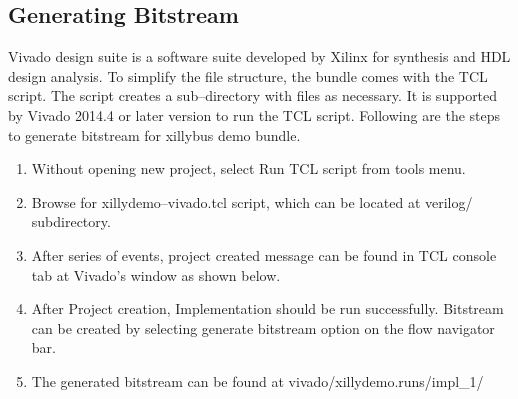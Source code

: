 \subsection{Generating Bitstream}
Vivado design suite is a software suite developed by Xilinx for synthesis and HDL design analysis. To simplify the file structure, the bundle comes with the TCL script. The script creates a sub--directory with files as necessary. It is supported by Vivado 2014.4 or later version to run the TCL script. Following are the steps to generate bitstream for xillybus demo bundle.
\begin{enumerate}\itemsep0em 
\item Without opening new project, select Run TCL script from tools menu.
\item Browse for xillydemo--vivado.tcl script, which can be located at verilog/ subdirectory.
\item After series of events, project created message can be found in TCL console tab at Vivado’s window as shown below.
	
\item After Project creation, Implementation should be run successfully. Bitstream can be created by selecting generate bitstream option on the flow navigator bar.
\item	The generated bitstream can be found at vivado/xillydemo.runs/impl\_1/
\end{enumerate}

